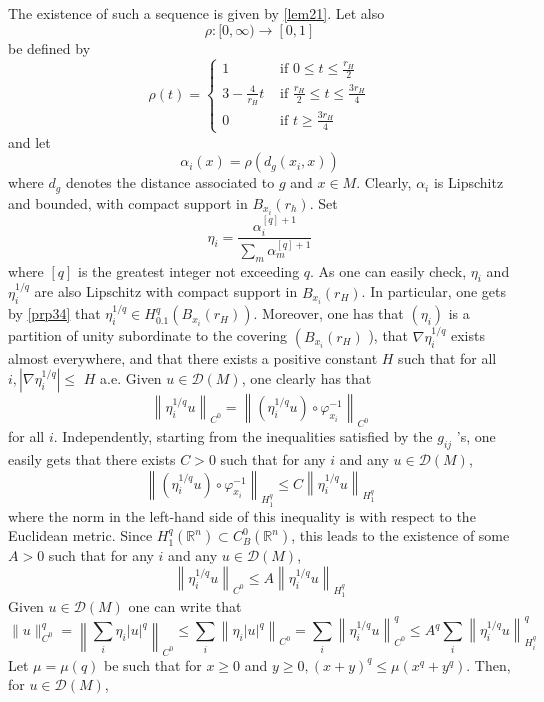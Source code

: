 \documentclass[12pt,hyperref,a4paper,UTF8]{ctexart}
\begin{document}
\begin{Proof}
\vskip 3pt
\noindent
The existence of such a sequence is given by \autoref{lem21}. Let also
$$
\rho:[0, \infty) \rightarrow[0,1]
$$
be defined by
$$
\rho(t)=\left\{\begin{array}{ll}
1 & \text { if } 0 \leq t \leq \frac{r_H}{2} \\
3-\frac{4}{r_H} t & \text { if } \frac{r_H}{2} \leq t \leq \frac{3 r_H}{4} \\
0 & \text { if } t \geq \frac{3 r_H}{4}
\end{array}\right.
$$
and let
$$
\alpha_i(x)=\rho\left(d_g\left(x_i, x\right)\right)
$$
where $d_g$ denotes the distance associated to $g$ and $x \in M$. Clearly, $\alpha_i$ is Lipschitz and bounded, with compact support in $B_{x_i}\left(r_h\right)$. Set
$$
\eta_i=\frac{\alpha_i^{[q]+1}}{\sum_m \alpha_m^{[q]+1}}
$$
where $[q]$ is the greatest integer not exceeding $q$. As one can easily check, $\eta_i$ and $\eta_i^{1 / q}$ are also Lipschitz with compact support in $B_{x_i}\left(r_H\right)$. In particular, one gets by \autoref{prp34} that $\eta_i^{1 / q} \in H_{0.1}^q\left(B_{x_i}\left(r_H\right)\right)$. Moreover, one has that $\left(\eta_i\right)$ is a partition of unity subordinate to the covering $\left(B_{x_i}\left(r_H\right)\right.$ ), that $\nabla \eta_i^{1 / q}$ exists almost everywhere, and that there exists a positive constant $H$ such that for all $i,\left|\nabla \eta_i^{1 / q}\right| \leq$ $H$ a.e. Given $u \in \mathcal{D}(M)$, one clearly has that
$$
\left\|\eta_i^{1 / q} u\right\|_{C^0}=\left\|\left(\eta_i^{1 / q} u\right) \circ \varphi_{x_i}^{-1}\right\|_{C^0}
$$
for all $i$. Independently, starting from the inequalities satisfied by the $g_{i j}$ 's, one easily gets that there exists $C>0$ such that for any $i$ and any $u \in \mathcal{D}(M)$,
$$
\left\|\left(\eta_i^{1 / q} u\right) \circ \varphi_{x_i}^{-1}\right\|_{H_1^q} \leq C\left\|\eta_i^{1 / q} u\right\|_{H_1^q}
$$
where the norm in the left-hand side of this inequality is with respect to the Euclidean metric. Since $H_1^q\left(\mathbb{R}^n\right) \subset C_B^0\left(\mathbb{R}^n\right)$, this leads to the existence of some $A>0$ such that for any $i$ and any $u \in \mathcal{D}(M)$,
$$
\left\|\eta_i^{1 / q} u\right\|_{C^0} \leq A\left\|\eta_i^{1 / q} u\right\|_{H_1^q}
$$
Given $u \in \mathcal{D}(M)$ one can write that
$$
\|u\|_{C^0}^q=\left\|\sum_i \eta_i|u|^q\right\|_{C^0} \leq \sum_i\left\|\eta_i|u|^q\right\|_{C^0}  =\sum_i\left\|\eta_i^{1 / q} u\right\|_{C^0}^q \leq A^q \sum_i\left\|\eta_i^{1 / q} u\right\|_{H_i^q}^q
$$
Let $\mu=\mu(q)$ be such that for $x \geq 0$ and $y \geq 0,(x+y)^q \leq \mu\left(x^q+y^q\right)$. Then, for $u \in \mathcal{D}(M)$,

\end{Proof}
\end{document}
